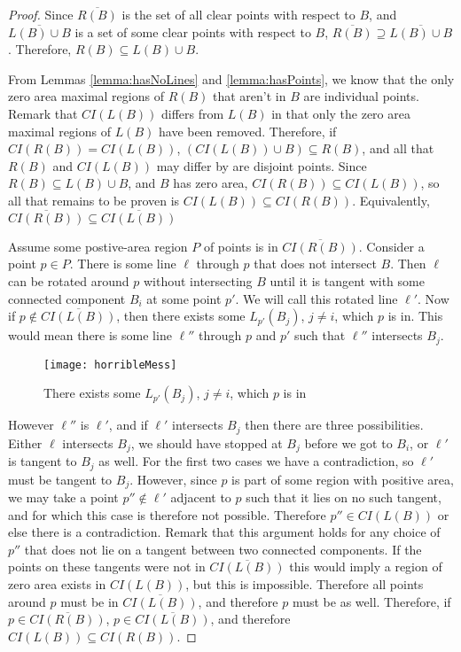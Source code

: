 \documentclass{cccg12}
\begin{document}
\begin{proof}
Since $\overline{R(B)}$ is the set of all clear points with respect to $B$, and $\overline{L(B) \cup B}$ is a set of some clear points with respect to $B$, $\overline{R(B)} \supseteq \overline{L(B) \cup B}$. Therefore, $R(B) \subseteq L(B) \cup B$. 

From Lemmas \ref{lemma:hasNoLines} and \ref{lemma:hasPoints}, we know that the only zero area maximal regions of $R(B)$ that aren't in $B$ are individual points. Remark that $CI(L(B))$ differs from $L(B)$ in that only the zero area maximal regions of $L(B)$ have been removed. Therefore, if $CI(R(B)) = CI(L(B))$, $(CI(L(B)) \cup B) \subseteq R(B)$, and all that $R(B)$ and $CI(L(B))$ may differ by are disjoint points. Since $R(B) \subseteq L(B) \cup B$, and $B$ has zero area, $CI(R(B)) \subseteq CI(L(B))$, so all that remains to be proven is $CI(L(B)) \subseteq CI(R(B))$. Equivalently, $\overline{CI(R(B))} \subseteq \overline{CI(L(B))}$

Assume some postive-area region $P$ of points is in 
	$\overline{CI(R(B))}$. Consider a point $p \in P$. There 
	is some line $\ell$ through $p$ that does not intersect $B$. 
	Then $\ell$ can be rotated around $p$ without intersecting $B$ 
	until it is tangent with some connected component $B_i$ at some 
	point $p'$. We will call this rotated line $\ell'$. Now if 
	$p \notin \overline{CI(L(B))}$, then there exists some 
	$L_{p'}(B_j)$, $j\neq i$, which $p$ is in. This would mean 
	there is some line $\ell''$ through $p$ and $p'$ such that 
	$\ell''$ intersects $B_j$. 

\begin{figure}[ht]
  \centering
  \texttt{[image: horribleMess]}
  \caption{There exists some $L_{p'}(B_j)$, $j\neq i$, which $p$ is in}
  \label{fig:horribleMess}
\end{figure}

However $\ell''$ is $\ell'$, and if $\ell'$ intersects $B_j$ then there are three possibilities. Either $\ell$ intersects $B_j$, we should have stopped at $B_j$ before we got to $B_i$, or $\ell'$ is tangent to $B_j$ as well. For the first two cases we have a contradiction, so $\ell'$ must be tangent to $B_j$. However, since $p$ is part of some region with positive area, we may take a point $p'' \notin \ell'$ adjacent to $p$ such that it lies on no such tangent, and for which this case is therefore not possible. Therefore $p'' \in CI(L(B))$ or else there is a contradiction. Remark that this argument holds for any choice of $p''$ that does not lie on a tangent between two connected components. If the points on these tangents were not in $\overline{CI(L(B))}$ this would imply a region of zero area exists in $CI(L(B))$, but this is impossible. Therefore all points around $p$ must be in $\overline{CI(L(B))}$, and therefore $p$ must be as well. Therefore, if $p \in \overline{CI(R(B))}$, $p \in \overline{CI(L(B))}$, and therefore $CI(L(B)) \subseteq CI(R(B))$.


\end{proof}
\end{document}
